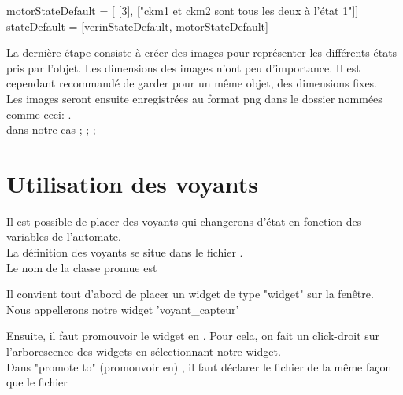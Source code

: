 {\begin{Python}
    motorStateDefault = [ [3], ["ckm1 et ckm2 sont tous les deux à l'état 1"]]
    stateDefault = [verinStateDefault, motorStateDefault]
\end{Python}


La dernière étape consiste à créer des images pour représenter les différents états pris par l'objet. Les dimensions des images n'ont peu d'importance. Il est cependant recommandé de garder pour un même objet, des dimensions fixes. \\

Les images seront ensuite enregistrées au format png dans le dossier   nommées comme ceci: .\\

dans notre cas  ;  ;  ; 



\newpage
\section{Utilisation des voyants}

Il est possible de placer des voyants qui changerons d'état en fonction des variables de l'automate. \\
La définition des voyants se situe dans le fichier .\\
Le  nom de la classe promue est 



Il convient tout d'abord de placer un widget de type "widget" sur la fenêtre. \\
Nous appellerons notre widget 'voyant\_capteur' \\




Ensuite, il faut promouvoir le widget en .
Pour cela, on fait un click-droit sur l'arborescence des widgets en sélectionnant notre widget. \\
Dans "promote to" (promouvoir en) , il faut déclarer le fichier  de la même façon que le fichier 



}
